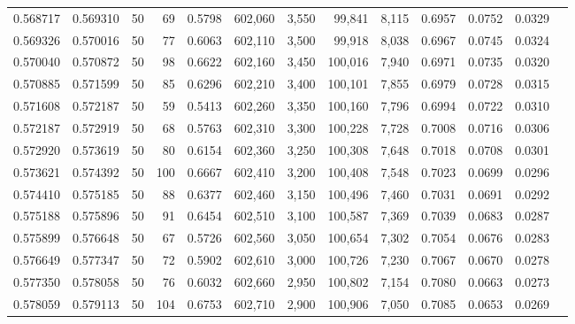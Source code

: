 \begin{tabular}{rrrrrrrrrrrrr}
0.568717 & 0.569310 &    50 &  69 &                                     0.5798 & 602,060 &   3,550 &  99,841 &   8,115 & 0.6957 & 0.0752 & 0.0329 \\
0.569326 & 0.570016 &    50 &  77 &                                     0.6063 & 602,110 &   3,500 &  99,918 &   8,038 & 0.6967 & 0.0745 & 0.0324 \\
0.570040 & 0.570872 &    50 &  98 &                                     0.6622 & 602,160 &   3,450 & 100,016 &   7,940 & 0.6971 & 0.0735 & 0.0320 \\
0.570885 & 0.571599 &    50 &  85 &                                     0.6296 & 602,210 &   3,400 & 100,101 &   7,855 & 0.6979 & 0.0728 & 0.0315 \\
0.571608 & 0.572187 &    50 &  59 &                                     0.5413 & 602,260 &   3,350 & 100,160 &   7,796 & 0.6994 & 0.0722 & 0.0310 \\
0.572187 & 0.572919 &    50 &  68 &                                     0.5763 & 602,310 &   3,300 & 100,228 &   7,728 & 0.7008 & 0.0716 & 0.0306 \\
0.572920 & 0.573619 &    50 &  80 &                                     0.6154 & 602,360 &   3,250 & 100,308 &   7,648 & 0.7018 & 0.0708 & 0.0301 \\
0.573621 & 0.574392 &    50 & 100 &                                     0.6667 & 602,410 &   3,200 & 100,408 &   7,548 & 0.7023 & 0.0699 & 0.0296 \\
0.574410 & 0.575185 &    50 &  88 &                                     0.6377 & 602,460 &   3,150 & 100,496 &   7,460 & 0.7031 & 0.0691 & 0.0292 \\
0.575188 & 0.575896 &    50 &  91 &                                     0.6454 & 602,510 &   3,100 & 100,587 &   7,369 & 0.7039 & 0.0683 & 0.0287 \\
0.575899 & 0.576648 &    50 &  67 &                                     0.5726 & 602,560 &   3,050 & 100,654 &   7,302 & 0.7054 & 0.0676 & 0.0283 \\
0.576649 & 0.577347 &    50 &  72 &                                     0.5902 & 602,610 &   3,000 & 100,726 &   7,230 & 0.7067 & 0.0670 & 0.0278 \\
0.577350 & 0.578058 &    50 &  76 &                                     0.6032 & 602,660 &   2,950 & 100,802 &   7,154 & 0.7080 & 0.0663 & 0.0273 \\
0.578059 & 0.579113 &    50 & 104 &                                     0.6753 & 602,710 &   2,900 & 100,906 &   7,050 & 0.7085 & 0.0653 & 0.0269 \\

\end{tabular}
